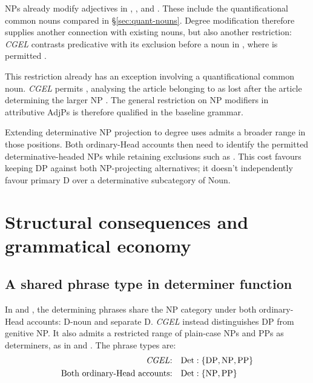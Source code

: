 \documentclass[12pt]{article}
\begin{document}
NPs already modify adjectives in , , and  \citep[549--550]{huddleston2002}. These include the quantificational common nouns compared in §\ref{sec:quant-nouns}. Degree modification therefore supplies another connection with existing nouns, but also another restriction: \textit{CGEL} contrasts predicative  with its exclusion before a noun in , where  is permitted \citep[551--552]{huddleston2002}.

This restriction already has an exception involving a quantificational common noun. \textit{CGEL} permits , analysing the article belonging to  as lost after the article determining the larger NP \citep[p.~552, n.~8]{huddleston2002}. The general restriction on NP modifiers in attributive AdjPs is therefore qualified in the baseline grammar.

Extending determinative NP projection to degree uses admits a broader range in those positions. Both ordinary-Head accounts then need to identify the permitted determinative-headed NPs while retaining exclusions such as . This cost favours keeping DP against both NP-projecting alternatives; it doesn't independently favour primary D over a determinative subcategory of Noun.

\section{Structural consequences and grammatical economy}\label{sec:economy}

\subsection{A shared phrase type in determiner function}\label{sec:det-uniform}

In  and , the determining phrases share the NP category under both ordinary-Head accounts: D-noun and separate D. \textit{CGEL} instead distinguishes DP from genitive NP. It also admits a restricted range of plain-case NPs and PPs as determiners, as in  and  \citep[Ch.~5, §4]{huddleston2002}. The phrase types are:
\[
\begin{aligned}
\text{\textit{CGEL}:} &\quad \mathrm{Det}:\{\mathrm{DP},\mathrm{NP},\mathrm{PP}\} \\
\text{Both ordinary-Head accounts:} &\quad \mathrm{Det}:\{\mathrm{NP},\mathrm{PP}\}
\end{aligned}
\]
\end{document}
